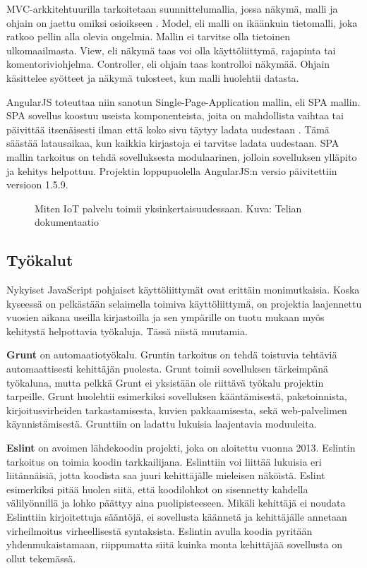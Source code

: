 \documentclass{tktltiki}
\begin{document}
MVC-arkkitehtuurilla tarkoitetaan suunnittelumallia, jossa näkymä, malli ja ohjain on jaettu omiksi osioikseen \cite{deacon2009model}. Model, eli malli on ikäänkuin tietomalli, joka ratkoo pellin alla olevia ongelmia. Mallin ei tarvitse olla tietoinen ulkomaailmasta. View, eli näkymä taas voi olla käyttöliittymä, rajapinta tai komentoriviohjelma. Controller, eli ohjain taas kontrolloi näkymää. Ohjain käsittelee syötteet ja näkymä tulosteet, kun malli huolehtii datasta. 

AngularJS toteuttaa niin sanotun Single-Page-Application mallin, eli SPA mallin. SPA sovellus koostuu useista komponenteista, joita on mahdollista vaihtaa tai päivittää itsenäisesti ilman että koko sivu täytyy ladata uudestaan \cite{jadhav2015single}. Tämä säästää latausaikaa, kun kaikkia kirjastoja ei tarvitse ladata uudestaan. SPA mallin tarkoitus on tehdä sovelluksesta modulaarinen, jolloin sovelluksen ylläpito ja kehitys helpottuu. Projektin loppupuolella AngularJS:n versio päivitettiin versioon 1.5.9.

\begin{figure}[h]
\begin{center}
\caption{Miten IoT palvelu toimii yksinkertaisuudessaan. Kuva: Telian dokumentaatio}
\label{IoT arkkitehtuuri}
\end{center}
\end{figure}

\subsection{Työkalut}

Nykyiset JavaScript pohjaiset käyttöliittymät ovat erittäin monimutkaisia. Koska kyseessä on pelkästään selaimella toimiva käyttöliittymä, on projektia laajennettu vuosien aikana useilla kirjastoilla ja sen ympärille on tuotu mukaan myös kehitystä helpottavia työkaluja. Tässä niistä muutamia. 

\textbf{Grunt} on automaatiotyökalu. Gruntin tarkoitus on tehdä toistuvia tehtäviä automaattisesti kehittäjän puolesta. Grunt toimii sovelluksen tärkeimpänä työkaluna, mutta pelkkä Grunt ei yksistään ole riittävä työkalu projektin tarpeille. Grunt huolehtii esimerkiksi sovelluksen kääntämisestä, paketoinnista, kirjoitusvirheiden tarkastamisesta, kuvien pakkaamisesta, sekä web-palvelimen käynnistämisestä. Grunttiin on ladattu lukuisia laajentavia moduuleita.

\textbf{Eslint} on avoimen lähdekoodin projekti, joka on aloitettu vuonna 2013. Eslintin tarkoitus on toimia koodin tarkkailijana. Eslinttiin voi liittää lukuisia eri liitännäisiä, jotta koodista saa juuri kehittäjälle mieleisen näköistä. Eslint esimerkiksi pitää huolen siitä, että koodilohkot on sisennetty kahdella välilyönnillä ja lohko päättyy aina puolipisteeseen. Mikäli kehittäjä ei noudata Eslinttiin kirjoitettuja sääntöjä, ei sovellusta käännetä ja kehittäjälle annetaan virheilmoitus virheellisestä syntaksista. Eslintin avulla koodia pyritään yhdenmukaistamaan, riippumatta siitä kuinka monta kehittäjää sovellusta on ollut tekemässä. 
\end{document}
